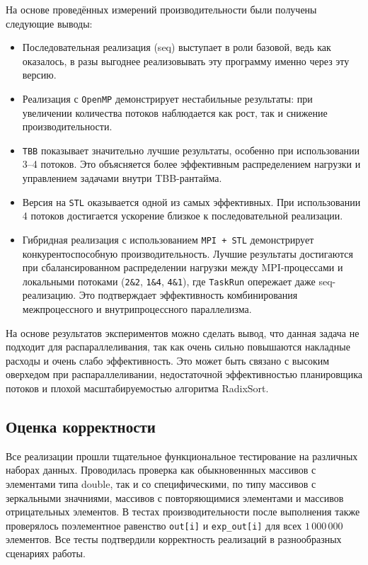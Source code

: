 \documentclass[12pt]{article}
\begin{document}
На основе проведённых измерений производительности были получены следующие выводы:
\begin{itemize}
  \item Последовательная реализация (seq) выступает в роли базовой, ведь как оказалось, в разы выгоднее реализовывать эту программу именно через эту версию.
  \item Реализация с \texttt{OpenMP} демонстрирует нестабильные результаты: при увеличении количества потоков наблюдается как рост, так и снижение производительности.
  \item \texttt{TBB} показывает значительно лучшие результаты, особенно при использовании 3--4 потоков. Это объясняется более эффективным распределением нагрузки и управлением задачами внутри TBB-рантайма.
  \item Версия на \texttt{STL} оказывается одной из самых эффективных. При использовании 4 потоков достигается ускорение близкое к последовательной реализации.
  \item Гибридная реализация с использованием \texttt{MPI + STL} демонстрирует конкурентоспособную производительность. Лучшие результаты достигаются при сбалансированном распределении нагрузки между MPI-процессами и локальными потоками (\texttt{2\&2}, \texttt{1\&4}, \texttt{4\&1}), где \texttt{TaskRun} опережает даже seq-реализацию. Это подтверждает эффективность комбинирования межпроцессного и внутрипроцессного параллелизма.
\end{itemize}

На основе результатов экспериментов можно сделать вывод, что данная задача не подходит для распараллеливания, так как очень сильно повышаются накладные расходы и очень слабо эффективность.  Это может быть связано с высоким оверхедом при распараллеливании, недостаточной эффективностью планировщика потоков и плохой масштабируемостью алгоритма RadixSort.

\subsection{Оценка корректности}

Все реализации прошли тщательное функциональное тестирование на различных наборах данных. Проводилась проверка как обыкновеннных массивов с элементами типа double, так и со специфическими, по типу массивов с зеркальными значниями, массивов с повторяющимися элементами и массивов отрицательных элементов. В тестах производительности после выполнения также проверялось поэлементное равенство \texttt{out[i]} и \texttt{exp\_out[i]} для всех $1\,000\,000$ элементов. Все тесты подтвердили корректность реализаций в разнообразных сценариях работы.
\end{document}
